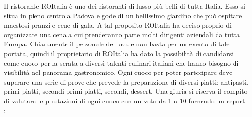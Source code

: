 \documentclass[../modello-progetto.tex]{subfiles}
\begin{document}
Il ristorante ROItalia è uno dei ristoranti di lusso più belli di tutta Italia. Esso si situa in pieno centro a Padova e gode di un bellissimo giardino che può ospitare maestosi pranzi e cene di gala. A tal proposito ROItalia ha deciso proprio di organizzare una cena a cui prenderanno parte molti dirigenti aziendali da tutta Europa. Chiaramente il personale del locale non basta per un evento di tale portata, quindi il proprietario di ROItalia ha dato la possibilità di candidarsi come cuoco per la serata a diversi talenti culinari italiani che hanno bisogno di visibilità nel panorama gastronomico. Ogni cuoco per poter partecipare deve superare una serie di prove che prevede la preparazione di diversi piatti: antipasti, primi piatti, secondi primi piatti, secondi, dessert. Una giuria si riserva il compito di valutare le prestazioni di ogni cuoco con un voto da 1 a 10 fornendo un report :
\end{document}
